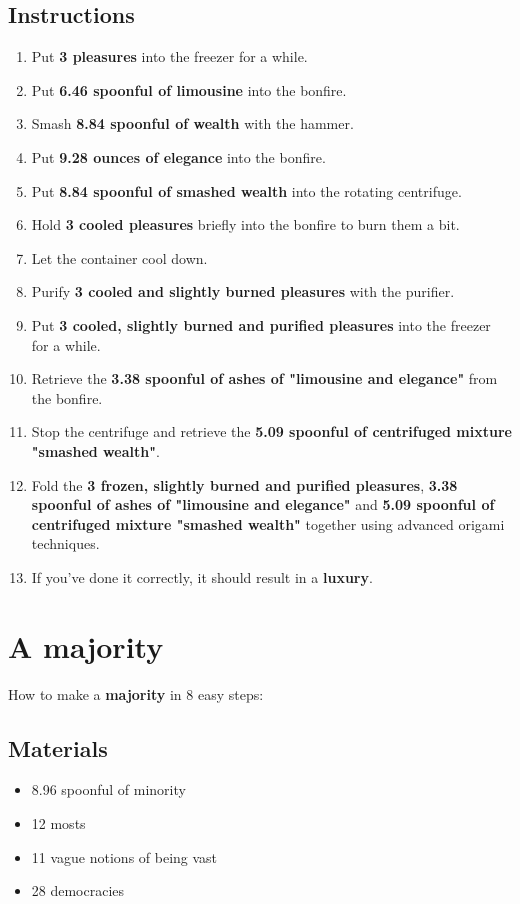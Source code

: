 \documentclass{article}
\begin{document}
\subsection{Instructions}\begin{enumerate}
\item 
Put \textbf{3 pleasures} into the freezer for a while.
\item 
Put \textbf{6.46 spoonful of limousine} into the bonfire.
\item 
Smash \textbf{8.84 spoonful of wealth} with the hammer.
\item 
Put \textbf{9.28 ounces of elegance} into the bonfire.
\item 
Put \textbf{8.84 spoonful of smashed wealth} into the rotating centrifuge.
\item 
Hold \textbf{3 cooled pleasures} briefly into the bonfire to burn them a bit.
\item 
Let the container cool down.
\item 
Purify \textbf{3 cooled and slightly burned pleasures} with the purifier.
\item 
Put \textbf{3 cooled, slightly burned and purified pleasures} into the freezer for a while.
\item 
Retrieve the \textbf{3.38 spoonful of ashes of "limousine and elegance"} from the bonfire.
\item 
Stop the centrifuge and retrieve the \textbf{5.09 spoonful of centrifuged mixture "smashed wealth"}.
\item 
Fold the \textbf{3 frozen, slightly burned and purified pleasures}, \textbf{3.38 spoonful of ashes of "limousine and elegance"} and \textbf{5.09 spoonful of centrifuged mixture "smashed wealth"} together using advanced origami techniques.
\item 
If you've done it correctly, it should result in a \textbf{luxury}.
\end{enumerate}
\newpage
\section{A majority}How to make a \textbf{majority} in 8 easy steps:

\subsection{Materials}\begin{itemize}
\item 
8.96 spoonful of minority
\item 
12 mosts
\item 
11 vague notions of being vast
\item 
28 democracies
\end{itemize}
\end{document}
